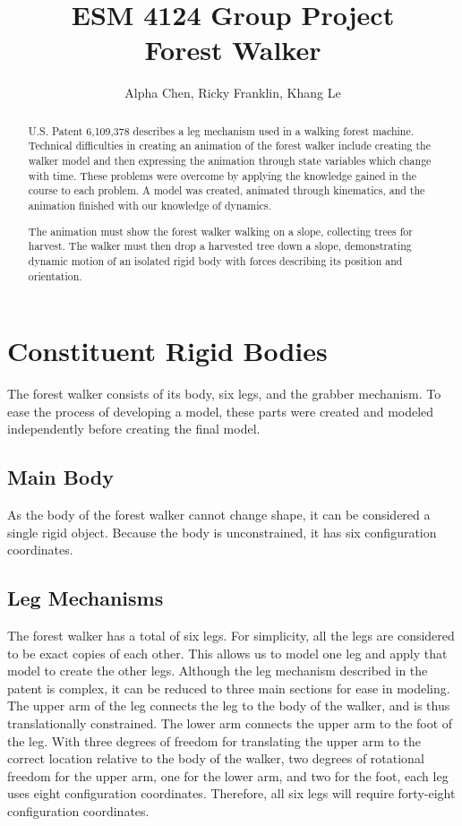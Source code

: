 \documentclass{article}
\begin{document}
\title{ESM 4124 Group Project \\ Forest Walker}
\author{Alpha Chen, Ricky Franklin, Khang Le}
\maketitle

\begin{abstract} %
U.S. Patent 6,109,378 describes a leg mechanism used in a walking forest machine. Technical difficulties in creating an animation of the forest walker include creating the walker model and then expressing the animation through state variables which change with time. These problems were overcome by applying the knowledge gained in the course to each problem. A model was created, animated through kinematics, and the animation finished with our knowledge of dynamics.

The animation must show the forest walker walking on a slope, collecting trees for harvest. The walker must then drop a harvested tree down a slope, demonstrating dynamic motion of an isolated rigid body with forces describing its position and orientation.
\end{abstract}%

\section{Constituent Rigid Bodies} %

The forest walker consists of its body, six legs, and the grabber mechanism. To ease the process of developing a model, these parts were created and modeled independently before creating the final model.

\subsection{Main Body}%
As the body of the forest walker cannot change shape, it can be considered a single rigid object. Because the body is unconstrained, it has six configuration coordinates.%

\subsection{Leg Mechanisms}%
The forest walker has a total of six legs. For simplicity, all the legs are considered to be exact copies of each other. This allows us to model one leg and apply that model to create the other legs. Although the leg mechanism described in the patent is complex, it can be reduced to three main sections for ease in modeling. The upper arm of the leg connects the leg to the body of the walker, and is thus translationally constrained. The lower arm connects the upper arm to the foot of the leg. With three degrees of freedom for translating the upper arm to the correct location relative to the body of the walker, two degrees of rotational freedom for the upper arm, one for the lower arm, and two for the foot, each leg uses eight configuration coordinates. Therefore, all six legs will require forty-eight configuration coordinates.%
\end{document}
